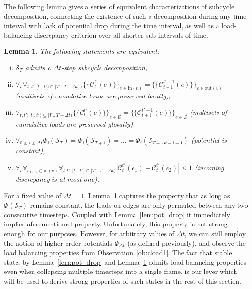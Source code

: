 \documentclass{article}[11pt,letter]
\newtheorem{lemma}[definition]{Lemma}
\newcommand{\state}{\mathcal{S}}
\newcommand{\inedg}{\mathrm{in}}
\newcommand{\outedg}{\mathrm{out}}
\newcommand{\cload}{\mathcal{C}}
\newcommand{\dt}{\Delta t}
\newcommand{\mset}[1]{\{\!\{#1\}\!\}}
\newcommand{\halfrange}[2]{[#1\,..\,#2)}
\begin{document}
The following lemma gives a series of equivalent characterizations of subcycle decomposition, connecting the existence of such a decomposition during any time interval with lack of potential drop during the time interval, as well as a load-balancing discrepancy criterion over all shorter sub-intervals of time.
\begin{lemma}
\label{lem:long}
The following statements are equivalent:
\begin{enumerate}[(i)]
\item \label{lem:long:item1} $\state_{T}$ admits a $\dt$-step subcycle decomposition,
\item \label{lem:long:item2} $\forall_v \forall_{ t,t' : \halfrange{t}{t'} \subseteq \halfrange{T}{T+\dt} }, \mset{\cload_{t}^{t'}(e)}_{e\in \inedg(v)} = \mset{\cload_{t+1}^{t'+1}(e)}_{e\in \outedg(v)}$ (multisets of cumulative loads are preserved locally),
\item \label{lem:long:item3} $\forall_{  t,t' : \halfrange{t}{t'} \subseteq \halfrange{T}{T+\dt} } \mset{\cload_{t}^{t'}(e)}_{e \in \vec{E}}  = \mset{ \cload_{t+1}^{t'+1}(e)}_{e \in \vec{E}}$ (multisets of cumulative loads are preserved globally),
\item \label{lem:long:item4} $\forall_{0 \le i \le \dt} \Phi_i(\state_{T}) = \Phi_i(\state_{T+1}) = \ldots = \Phi_i(\state_{T+\dt-i+1})$ (potential is constant),
\item \label{lem:long:item5} $\forall_v \forall_{e_1,e_2 \in \inedg(v)} \forall_{  t,t' : \halfrange{t}{t'} \subseteq \halfrange{T}{T+\dt} }  |\cload_{t}^{t'}(e_1) - \cload_{t}^{t'}(e_2)| \le 1$ (incoming discrepancy is at most one).
\end{enumerate}
\end{lemma}

For a fixed value of $\dt=1$, Lemma~\ref{lem:long} captures the property that as long as $\Phi(\state_{T})$ remains constant, the loads on edges are only permuted between any two consecutive timesteps. Coupled with Lemma~\ref{lem:pot_drop} it immediately implies aforementioned property. Unfortunately, this property is not strong enough for our purposes. However, for arbitrary values of $\dt$, we can still employ the notion of higher order potentials $\Phi_{\dt}$ (as defined previously), and observe the load balancing properties from Observation~\ref{ob:cload1}. The fact that stable state, by Lemma~\ref{lem:pot_drop} and Lemma~\ref{lem:long} admits load balancing properties even when collapsing multiple timesteps into a single frame, is our lever which will be used to derive strong properties of such states in the rest of this section.
\end{document}
